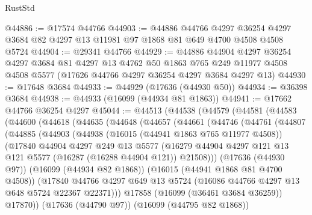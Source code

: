 \begin{lexlean}{RustStd}
\begin{coremodule}
@44886 := @17574 @44766
@44903 := @44886
    @44766
    @4297
    @36254
    @4297
    @3684
    @82
    @4297
    @13
    @11981
    @97
    @1868
    @81
    @649
    @4700
    @4508
    @4508
    @5724
@44904 := @29341 @44766
@44929 := @44886
    @44904
    @4297
    @36254
    @4297
    @3684
    @81
    @4297
    @13
    @4762
    @50
    @1863
    @765
    @249
    @11977
    @4508
    @4508
    @5577
    (@17626 @44766 @4297 @36254 @4297 @3684 @4297 @13)
@44930 := @17648 @3684
@44933 := @44929 (@17636 (@44930 @50))
@44934 := @36398 @3684
@44938 := @44933 (@16099 (@44934 @81 @1863))
@44941 := @17662 @44766 @36254 @4297
@45044 := @44513
    (@44538
      (@44579
        (@44581
          (@44583
            (@44600
              (@44618
                (@44635
                  (@44648
                    (@44657
                      (@44661
                        (@44746
                          (@44761
                            (@44807
                              (@44885
                                (@44903
                                  (@44938
                                    (@16015 (@44941 @1863 @765 @11977 @4508))
                                    (@17840
                                      @44904
                                      @4297
                                      @249
                                      @13
                                      @5577
                                      (@16279
                                        @44904
                                        @4297
                                        @121
                                        @13
                                        @121
                                        @5577
                                        (@16287 (@16288 @44904 @121))
                                        @21508)))
                                  (@17636 (@44930 @97))
                                  (@16099 (@44934 @82 @1868))
                                  (@16015 (@44941 @1868 @81 @4700 @4508))
                                  (@17840
                                    @44766
                                    @4297
                                    @649
                                    @13
                                    @5724
                                    (@16086 @44766 @4297 @13 @648 @5724 @22367 @22371)))
                                @17858
                                (@16099 (@36461 @3684 @36259))
                                @17870))
                            (@17636 (@44790 @97))
                            (@16099 (@44795 @82 @1868))

\end{coremodule}
\end{lexlean}
